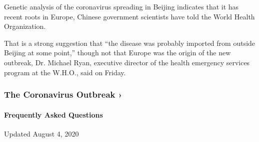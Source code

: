 Genetic analysis of the coronavirus spreading in Beijing indicates that
it has recent roots in Europe, Chinese government scientists have told
the World Health Organization.

That is a strong suggestion that ``the disease was probably imported
from outside Beijing at some point,'' though not that Europe was the
origin of the new outbreak, Dr. Michael Ryan, executive director of the
health emergency services program at the W.H.O., said on Friday.

\href{https://www.nytimes3xbfgragh.onion/news-event/coronavirus?action=click\&pgtype=Article\&state=default\&region=MAIN_CONTENT_3\&context=storylines_faq}{}

\hypertarget{the-coronavirus-outbreak-}{%
\subsubsection{The Coronavirus Outbreak
›}\label{the-coronavirus-outbreak-}}

\hypertarget{frequently-asked-questions}{%
\paragraph{Frequently Asked
Questions}\label{frequently-asked-questions}}

Updated August 4, 2020

